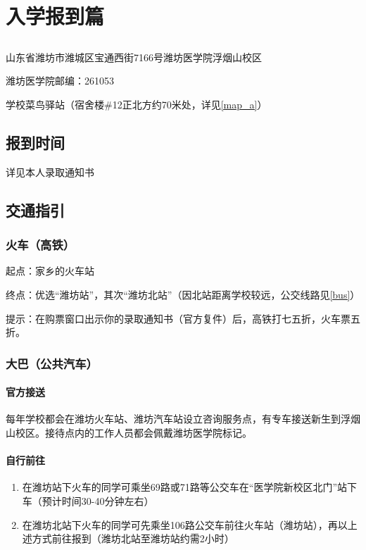 \chapter[入学报到篇]{入学报到篇}
\section[报到地址（也是快递地址）]{}
山东省潍坊市潍城区宝通西街7166号潍坊医学院浮烟山校区

潍坊医学院邮编：261053

学校菜鸟驿站（宿舍楼\#12正北方约70米处，详见\uline{\ref{map_a}}）

\section[报到时间]{报到时间}
详见本人录取通知书

\section[交通指引]{交通指引}
\subsection[火车（高铁）]{火车（高铁）}
起点：家乡的火车站

终点：优选“潍坊站”，其次“潍坊北站”（因北站距离学校较远，公交线路见\uline{\ref{bus}}）

提示：在购票窗口出示你的录取通知书（官方复件）后，高铁打七五折，火车票五折。

\subsection[大巴（公共汽车）]{大巴（公共汽车）}

\subsubsection[官方接送]{官方接送}
每年学校都会在潍坊火车站、潍坊汽车站设立咨询服务点，有专车接送新生到浮烟山校区。接待点内的工作人员都会佩戴潍坊医学院标记。

\subsubsection[自行前往]{自行前往}
\begin{enumerate}
    \item 在潍坊站下火车的同学可乘坐69路或71路等公交车在“医学院新校区北门”站下车（预计时间30-40分钟左右）\label{bus}
    \item 在潍坊北站下火车的同学可先乘坐106路公交车前往火车站（潍坊站），再以上述方式前往报到（潍坊北站至潍坊站约需2小时）
\end{enumerate}


